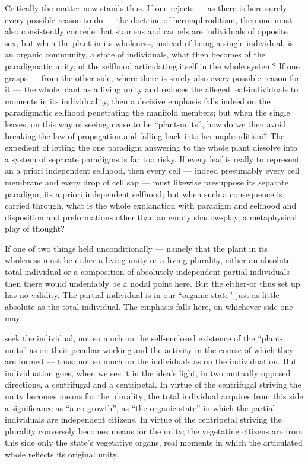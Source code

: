 \documentclass[12pt,a4paper]{book}
\begin{document}
Critically the matter now stands thus. If one rejects --- as there is here surely
every possible reason to do --- the doctrine of hermaphroditism, then one must
also consistently concede that stamens and carpels are individuals of opposite
sex; but when the plant in its wholeness, instead of being a single individual, is
an organic community, a state of individuals, what then becomes of the paradigmatic
unity, of the selfhood articulating itself in the whole system? If one grasps ---
from the other side, where there is surely also every possible reason for it ---
the whole plant as a living unity and reduces the alleged leaf-individuals to
moments in its individuality, then a decisive emphasis falls indeed on the
paradigmatic selfhood penetrating the manifold members; but when the single leaves,
on this way of seeing, cease to be ``plant-units'', how do we then avoid breaking
the law of propagation and falling back into hermaphroditism? The expedient of
letting the one paradigm answering to the whole plant dissolve into a system of
separate paradigms is far too risky. If every leaf is really to represent an a
priori independent selfhood, then every cell --- indeed presumably every cell
membrane and every drop of cell sap --- must likewise presuppose its separate
paradigm, its a priori independent selfhood; but when such a consequence is carried
through, what is the whole explanation with paradigm and selfhood and disposition
and preformations other than an empty shadow-play, a metaphysical play of thought?

If one of two things held unconditionally --- namely that the plant in its wholeness
must be either a living unity or a living plurality, either an absolute total
individual or a composition of absolutely independent partial individuals --- then
there would undeniably be a nodal point here. But the either-or thus set up has no
validity. The partial individual is in our ``organic state'' just as little
absolute as the total individual. The emphasis falls here, on whichever side one
may

seek the individual, not so much on the self-enclosed existence of the
``plant-units'' as on their peculiar working and the activity in the course of which they are formed
--- thus: not so much on the individuals as on the individuation. But individuation
goes, when we see it in the idea's light, in two mutually opposed directions, a
centrifugal and a centripetal. In virtue of the centrifugal striving the unity
becomes means for the plurality; the total individual acquires from this side a
significance as ``a co-growth'', as ``the organic state'' in which the partial
individuals are independent citizens. In virtue of the centripetal striving the
plurality conversely becomes means for the unity; the vegetating citizens are from
this side only the state's vegetative organs, real moments in which the articulated
whole reflects its original unity.
\end{document}
